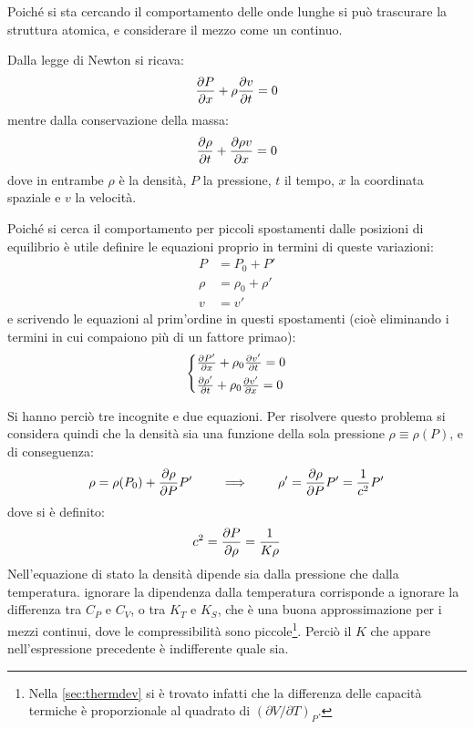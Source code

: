 \noindent Poiché si sta cercando il comportamento delle onde lunghe si può trascurare la struttura atomica, e considerare il mezzo come un continuo.

Dalla legge di Newton si ricava:
\begin{equation*}
\frac{\partial {P}}{\partial {x}} + \rho\frac{\partial {v}}{\partial {t}} = 0
\end{equation*}
mentre dalla conservazione della massa:
\begin{equation*}
\frac{\partial {\rho}}{\partial {t}} + \frac{\partial {\rho v}}{\partial {x}} = 0
\end{equation*}
dove in entrambe $ \rho $ è la densità, $ P $ la pressione, $ t $ il tempo, $ x $ la coordinata spaziale e $ v $ la velocità.

Poiché si cerca il comportamento per piccoli spostamenti dalle posizioni di equilibrio è utile definire le equazioni proprio in termini di queste variazioni:
\begin{align*}
P &= P_0 + P'\\
\rho &= \rho_0 + \rho'\\
v &= v'
\end{align*}
e scrivendo le equazioni al prim'ordine in questi spostamenti (cioè eliminando i termini in cui compaiono più di un fattore primao):
\begin{equation*}
\begin{cases*}
\partdev{P'}{x} + \rho_0 \partdev{v'}{t} = 0\\
\partdev{\rho'}{t} + \rho_0 \partdev{v'}{x} = 0
\end{cases*}
\end{equation*}

Si hanno perciò tre incognite e due equazioni. Per risolvere questo problema si considera quindi che la densità sia una funzione della sola pressione $ \rho \equiv \rho(P) $, e di conseguenza:
\begin{equation*}
\rho = \rho(P_0) + \frac{\partial {\rho}}{\partial {P}} P' \qquad \implies \qquad \rho' = \frac{\partial {\rho}}{\partial {P}} P' = \frac{1}{c^2} P'
\end{equation*}
dove si è definito\footnotemark:
\begin{equation*}
c^2 = \frac{\partial {P}}{\partial {\rho}} = \frac{1}{K \rho}
\end{equation*}
Nell'equazione di stato la densità dipende sia dalla pressione che dalla temperatura. ignorare la dipendenza dalla temperatura corrisponde a ignorare la differenza tra $ C_P $ e $ C_V $, o tra $ K_T $ e $ K_S $, che è una buona approssimazione per i mezzi continui, dove le compressibilità sono piccole\footnote{Nella \cref{sec:thermdev} si è trovato infatti che la differenza delle capacità termiche è proporzionale al quadrato di $ (\partial V / \partial T)_P $.}. Perciò il $ K $ che appare nell'espressione precedente è indifferente quale sia.

